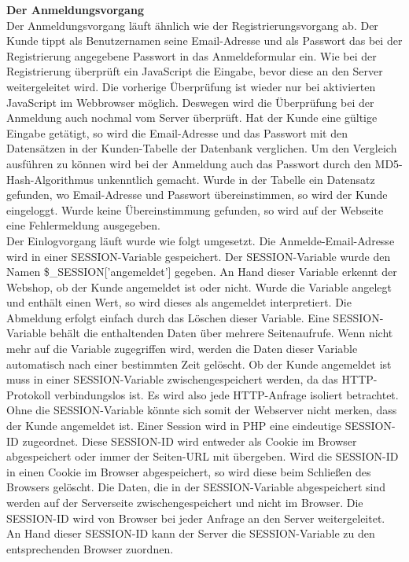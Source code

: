 \textbf{Der Anmeldungsvorgang}\\
Der Anmeldungsvorgang läuft ähnlich wie der Registrierungsvorgang ab. Der Kunde tippt als Benutzernamen seine Email-Adresse und als Passwort das bei der Registrierung angegebene Passwort in das Anmeldeformular ein. Wie bei der Registrierung überprüft ein JavaScript die Eingabe, bevor diese an den Server weitergeleitet wird. Die vorherige Überprüfung ist wieder nur bei aktivierten JavaScript im Webbrowser möglich. Deswegen wird die Überprüfung bei der Anmeldung auch nochmal vom Server überprüft. Hat der Kunde eine gültige Eingabe getätigt, so wird die Email-Adresse und das Passwort mit den Datensätzen in der Kunden-Tabelle der Datenbank verglichen. Um den Vergleich ausführen zu können wird bei der Anmeldung auch das Passwort durch den  \glqq MD5-Hash-Algorithmus\grqq{} unkenntlich gemacht. Wurde in der Tabelle ein Datensatz gefunden, wo Email-Adresse und Passwort übereinstimmen, so wird der Kunde eingeloggt. Wurde keine Übereinstimmung gefunden, so wird auf der Webseite eine Fehlermeldung ausgegeben.\\ 
Der Einlogvorgang läuft wurde wie folgt umgesetzt. Die Anmelde-Email-Adresse wird in einer SESSION-Variable gespeichert. Der SESSION-Variable wurde den Namen \glqq \$\_SESSION['angemeldet']\grqq{} gegeben. An Hand dieser Variable erkennt der Webshop, ob der Kunde angemeldet ist oder nicht. Wurde die Variable angelegt und enthält einen Wert, so wird dieses als angemeldet interpretiert. Die Abmeldung erfolgt einfach durch das Löschen dieser Variable. Eine SESSION-Variable behält die enthaltenden Daten über mehrere Seitenaufrufe. Wenn nicht mehr auf die Variable zugegriffen wird, werden die Daten dieser Variable automatisch nach einer bestimmten Zeit gelöscht. Ob der Kunde angemeldet ist muss in einer SESSION-Variable zwischengespeichert werden, da das HTTP-Protokoll verbindungslos ist. Es wird also jede HTTP-Anfrage isoliert betrachtet. Ohne die SESSION-Variable könnte sich somit der Webserver nicht merken, dass der Kunde angemeldet ist. Einer Session wird in PHP eine eindeutige \glqq SESSION-ID\grqq{} zugeordnet. Diese SESSION-ID wird entweder als Cookie im Browser abgespeichert oder immer der Seiten-URL mit übergeben. Wird die SESSION-ID in einen Cookie im Browser abgespeichert, so wird diese beim Schließen des Browsers gelöscht. Die Daten, die in der SESSION-Variable abgespeichert sind werden auf der Serverseite zwischengespeichert und nicht im Browser. Die SESSION-ID wird von Browser bei jeder Anfrage an den Server weitergeleitet. An Hand dieser SESSION-ID kann der Server die SESSION-Variable zu den entsprechenden Browser zuordnen.\\

